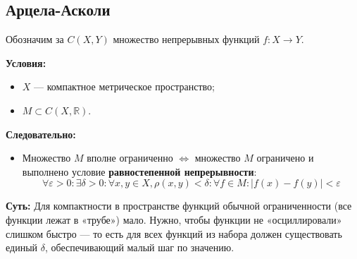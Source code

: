 \subsection{Арцела-Асколи}


\begin{definition}
	Обозначим за $C(X, Y)$ множество непрерывных функций $f: X \to Y$.
\end{definition}

\begin{theorem}\label{arzela-ascoli}
	\textbf{Условия:}
	\begin{itemize}
		\item $X$ --- компактное метрическое пространство;
		\item $M \subset C(X, \mathbb{R})$.
	\end{itemize}
	\textbf{Следовательно:}
	\begin{itemize}
		\item Множество $M$ вполне ограниченно $\Leftrightarrow$ множество $M$ ограничено и выполнено условие \textbf{равностепенной непрерывности}:
		\[
		\forall \varepsilon > 0: \exists \delta > 0: \forall x, y \in X, \rho(x, y) < \delta: \forall f \in M: |f(x) - f(y)| < \varepsilon 
		\]
	\end{itemize}
\end{theorem}

\begin{idea}
	\textbf{Суть:} Для компактности в пространстве функций обычной ограниченности (все функции лежат в «трубе») мало. Нужно, чтобы функции не «осциллировали» слишком быстро — то есть для всех функций из набора должен существовать единый $\delta$, обеспечивающий малый шаг по значению.
\end{idea}

